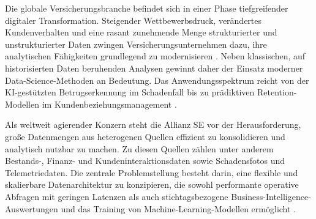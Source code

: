 Die globale Versicherungsbranche befindet sich in einer Phase tiefgreifender
digitaler Transformation. Steigender Wettbewerbsdruck, verändertes
Kundenverhalten und eine rasant zunehmende Menge strukturierter und
unstrukturierter Daten zwingen Versicherungsunternehmen dazu, ihre
analytischen Fähigkeiten grundlegend zu modernisieren
\citep{eiopa2023digitalisation}. Neben klassischen, auf historisierten Daten
beruhenden Analysen gewinnt daher der Einsatz moderner
Data-Science-Methoden an Bedeutung. Das Anwendungsspektrum reicht von der
KI-gestützten Betrugserkennung im Schadenfall bis zu prädiktiven
Retention-Modellen im Kundenbeziehungsmanagement
\citep{debener2023,spiteri2018}.

Als weltweit agierender Konzern steht die Allianz SE vor der Herausforderung,
große Datenmengen aus heterogenen Quellen effizient zu konsolidieren und
analytisch nutzbar zu machen. Zu diesen Quellen zählen unter anderem
Bestands-, Finanz- und Kundeninteraktionsdaten sowie Schadensfotos und
Telemetriedaten. Die zentrale Problemstellung besteht darin, eine flexible und
skalierbare Datenarchitektur zu konzipieren, die sowohl performante operative
Abfragen mit geringen Latenzen als auch stichtagsbezogene
Business-Intelligence-Auswertungen und das Training von
Machine-Learning-Modellen ermöglicht \citep{schulz2024}.
